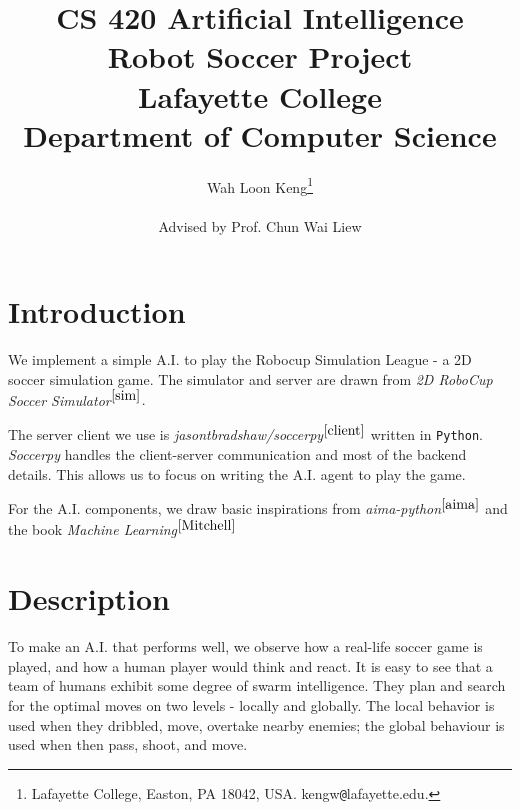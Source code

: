 \documentclass[12pt]{article}  %
\begin{document}
\title{CS 420 Artificial Intelligence\\
Robot Soccer Project \\
Lafayette College \\
Department of Computer Science
}

\author{
{Wah Loon Keng}\thanks{
Lafayette College,
Easton, PA 18042, USA.
kengw{\tt @}lafayette.edu.}
\\
\\
{Advised by Prof. Chun Wai Liew}
}
\maketitle




\section{Introduction} \label{intro}

We implement a simple A.I. to play the Robocup Simulation League - a 2D soccer simulation game. The simulator and server are drawn from \emph{2D RoboCup Soccer Simulator$^{\ref{sim}}$}. 

The server client we use is \emph{jasontbradshaw/soccerpy$^{\ref{client}}$} written in {\tt Python}. \emph{Soccerpy} handles the client-server communication and most of the backend details. This allows us to focus on writing the A.I. agent to play the game. 

For the A.I. components, we draw basic inspirations from \emph{aima-python}$^{\ref{aima}}$ and the book \emph{Machine Learning}$^{\ref{Mitchell}}$


\section{Description}

To make an A.I. that performs well, we observe how a real-life soccer game is played, and how a human player would think and react. It is easy to see that a team of humans exhibit some degree of swarm intelligence. They plan and search for the optimal moves on two levels - locally and globally. The local behavior is used when they dribbled, move, overtake nearby enemies; the global behaviour is used when then pass, shoot, and move.
\end{document}
